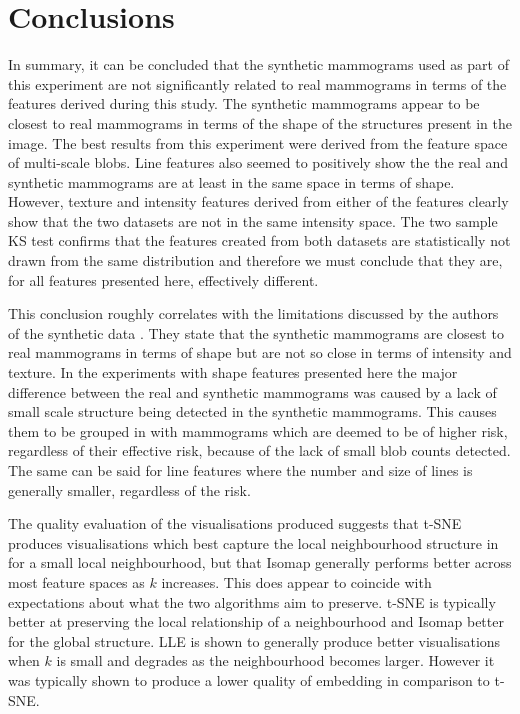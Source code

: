\section{Conclusions}
In summary, it can be concluded that the synthetic mammograms used as part of this experiment are not significantly related to real mammograms in terms of the features derived during this study. The synthetic mammograms appear to be closest to real mammograms in terms of the shape of the structures present in the image. The best results from this experiment were derived from the feature space of multi-scale blobs. Line features also seemed to positively show the the real and synthetic mammograms are at least in the same space in terms of shape. However, texture and intensity features derived from either of the features clearly show that the two datasets are not in the same intensity space. The two sample KS test confirms that the features created from both datasets are statistically not drawn from the same distribution and therefore we must conclude that they are, for all features presented here, effectively different.

This conclusion roughly correlates with the limitations discussed by the authors of the synthetic data \cite{bakic2002mammogram1, bakic2002mammogram2, bakic2003mammogram3}. They state that the synthetic mammograms are closest to real mammograms in terms of shape but are not so close in terms of intensity and texture. In the experiments with shape features presented here the major difference between the real and synthetic mammograms was caused by a lack of small scale structure being detected in the synthetic mammograms. This causes them to be grouped in with mammograms which are deemed to be of higher risk, regardless of their effective risk, because of the lack of small blob counts detected. The same can be said for line features where the number and size of lines is generally smaller, regardless of the risk.

The quality evaluation of the visualisations produced suggests that t-SNE produces visualisations which best capture the local neighbourhood structure in for a small local neighbourhood, but that Isomap generally performs better across most feature spaces as $k$ increases. This does appear to coincide with expectations about what the two algorithms aim to preserve. t-SNE is typically better at preserving the local relationship of a neighbourhood and Isomap better for the global structure. LLE is shown to generally produce better visualisations when $k$ is small and degrades as the neighbourhood becomes larger. However it was typically shown to produce a lower quality of embedding in comparison to t-SNE.


